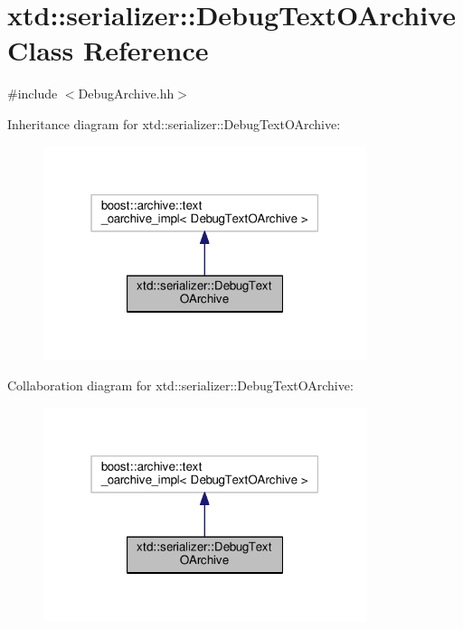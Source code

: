 \hypertarget{classxtd_1_1serializer_1_1DebugTextOArchive}{}\section{xtd\+:\+:serializer\+:\+:Debug\+Text\+O\+Archive Class Reference}
\label{classxtd_1_1serializer_1_1DebugTextOArchive}


{\ttfamily \#include $<$Debug\+Archive.\+hh$>$}



Inheritance diagram for xtd\+:\+:serializer\+:\+:Debug\+Text\+O\+Archive\+:
\nopagebreak
\begin{figure}[H]
\begin{center}
\leavevmode
\includegraphics[width=268pt]{classxtd_1_1serializer_1_1DebugTextOArchive__inherit__graph}
\end{center}
\end{figure}


Collaboration diagram for xtd\+:\+:serializer\+:\+:Debug\+Text\+O\+Archive\+:
\nopagebreak
\begin{figure}[H]
\begin{center}
\leavevmode
\includegraphics[width=268pt]{classxtd_1_1serializer_1_1DebugTextOArchive__coll__graph}
\end{center}
\end{figure}
